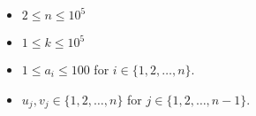 \begin{itemize}
\tightlist
\item $2 \le n \le 10^5$
\item $1 \le k \le 10^5$
\item $1 \le a_i \le 100$ for $i\in\{1,2,\dots,n\}$.
\item $u_j,v_j\in \{1,2,\dots,n\}$ for $j\in \{1,2,\dots,n-1\}$.
\end{itemize}

